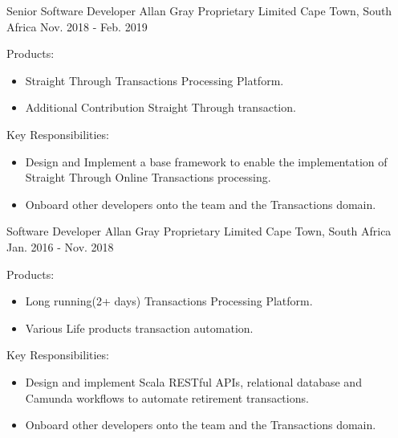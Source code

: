 \begin{cventries}
  \cventry
    {Senior Software Developer} %
    {Allan Gray Proprietary Limited} %
    {Cape Town, South Africa} %
    {Nov. 2018 - Feb. 2019} %
    {
      \begin{cvitems} %
        \item {Products:}
        \begin{itemize}
          \item {Straight Through Transactions Processing Platform.}
          \item {Additional Contribution Straight Through transaction.}
        \end{itemize}
        \item {Key Responsibilities:}
        \begin{itemize}
          \item {Design and Implement a base framework to enable the implementation of Straight Through Online Transactions processing.}
          \item {Onboard other developers onto the team and the Transactions domain.}
        \end{itemize}
      \end{cvitems}
    }

  \cventry
    {Software Developer} %
    {Allan Gray Proprietary Limited} %
    {Cape Town, South Africa} %
    {Jan. 2016 - Nov. 2018} %
    {
      \begin{cvitems} %
        \item {Products:}
        \begin{itemize}
          \item {Long running(2+ days) Transactions Processing Platform.}
          \item {Various Life products transaction automation.}
        \end{itemize}
        \item {Key Responsibilities:}
        \begin{itemize}
          \item {Design and implement Scala RESTful APIs, relational database and Camunda workflows to automate retirement transactions.}
          \item {Onboard other developers onto the team and the Transactions domain.}
        \end{itemize}
      \end{cvitems}
    }


\end{cventries}
